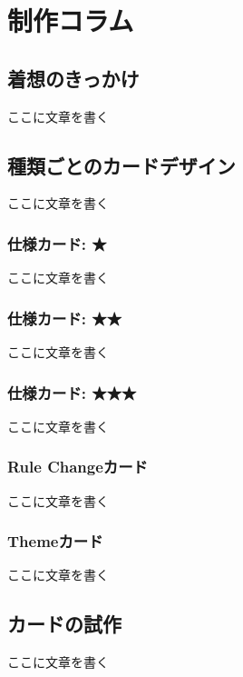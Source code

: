 \documentclass[index]{subfiles}
\begin{document}
  \chapter{制作コラム}
  \label{ch:third}

  \section{着想のきっかけ}

  ここに文章を書く

  \section{種類ごとのカードデザイン}

  ここに文章を書く

  \subsection{仕様カード: ★}

  ここに文章を書く

  \subsection{仕様カード: ★★}

  ここに文章を書く

  \subsection{仕様カード: ★★★}

  ここに文章を書く

  \subsection{Rule Changeカード}

  ここに文章を書く

  \subsection{Themeカード}

  ここに文章を書く

  \section{カードの試作}

  ここに文章を書く
\end{document}
